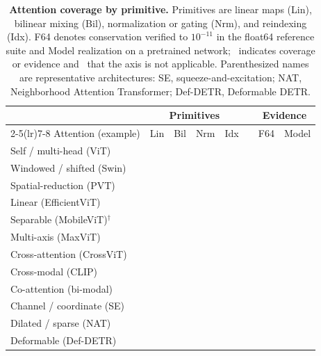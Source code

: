 \documentclass[lettersize,journal]{IEEEtran}
\theoremstyle{definition}
\theoremstyle{plain}
\newcommand{\cmark}{\ding{51}}
\newcommand{\nd}{\textemdash}            %
\begin{document}
\begin{table}[!tbp]
  \centering
  \caption{\textbf{Attention coverage by primitive.} Primitives are linear maps
  (\textsf{Lin}), bilinear mixing (\textsf{Bil}), normalization or gating
  (\textsf{Nrm}), and reindexing (\textsf{Idx}). \textsf{F64} denotes
  conservation verified to $10^{-11}$ in the float64 reference suite and
  \textsf{Model} realization on a pretrained network; \cmark\ indicates coverage
  or evidence and \nd\ that the axis is not applicable. Parenthesized names are
  representative architectures: SE, squeeze-and-excitation; NAT, Neighborhood
  Attention Transformer; Def-DETR, Deformable DETR.}
  \label{tab:attn-coverage}
  \setlength{\tabcolsep}{3pt}
  \footnotesize
  \begin{tabular}{@{}l cccc c cc@{}}
    \toprule
    & \multicolumn{4}{c}{Primitives} & & \multicolumn{2}{c}{Evidence} \\
    \cmidrule(lr){2-5}\cmidrule(lr){7-8}
    Attention (example) & \textsf{Lin} & \textsf{Bil} & \textsf{Nrm} & \textsf{Idx} & & \textsf{F64} & \textsf{Model} \\
    \midrule
    Self / multi-head (ViT)    & \cmark & \cmark & \cmark & \cmark & & \cmark & \cmark \\
    Windowed / shifted (Swin)  & \cmark & \cmark & \cmark & \cmark & & \cmark & \cmark \\
    Spatial-reduction (PVT)    & \cmark & \cmark & \cmark & \cmark & &        & \cmark \\
    Linear (EfficientViT)      & \cmark & \cmark & \cmark & \cmark & & \cmark & \cmark \\
    Separable (MobileViT)$^{\dagger}$ & \cmark & \cmark & \cmark &  & &        & \cmark \\
    Multi-axis (MaxViT)        & \cmark & \cmark & \cmark & \cmark & &        & \cmark \\
    Cross-attention (CrossViT) & \cmark & \cmark & \cmark & \cmark & & \cmark & \cmark \\
    Cross-modal (CLIP)         & \cmark & \cmark & \cmark & \cmark & &        & \cmark \\
    Co-attention (bi-modal)    & \cmark & \cmark & \cmark & \cmark & & \cmark &        \\
    Channel / coordinate (SE)  & \cmark &        & \cmark &        & & \cmark &        \\
    Dilated / sparse (NAT)     & \cmark & \cmark & \cmark & \cmark & & \cmark &        \\
    Deformable (Def-DETR)      & \cmark & \cmark & \cmark & \cmark & & \cmark &        \\

\end{tabular}
\end{table}
\end{document}
